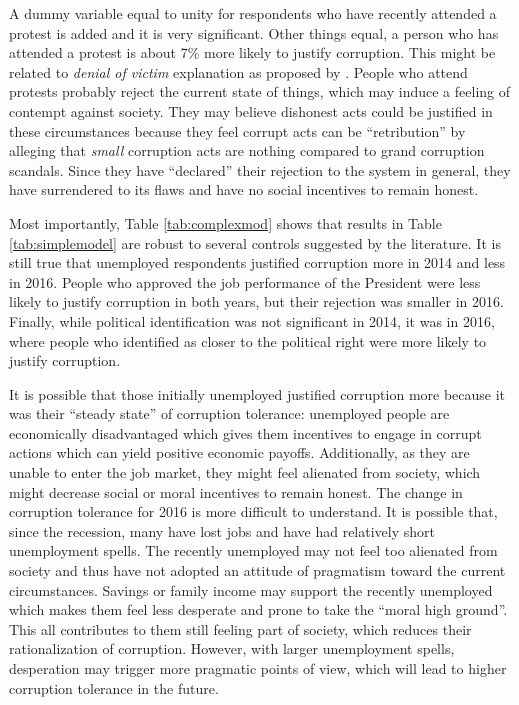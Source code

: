 \documentclass[12pt,a4]{article}\usepackage[]{graphicx}\usepackage[]{xcolor}
\begin{document}


A dummy variable equal to unity for respondents who have recently attended a protest is added and it is very significant. Other things equal, a person who has attended a protest is about 7\% more likely to justify corruption. This might be related to \textit{denial of victim} explanation as proposed by \textcite{Ashforth.2003}. People who attend protests probably reject the current state of things, which may induce a feeling of contempt against society. They may believe dishonest acts could be justified in these circumstances because they feel corrupt acts can be \enquote{retribution} by alleging that \textit{small} corruption acts are nothing compared to grand corruption scandals. Since they have \enquote{declared} their rejection to the system in general, they have surrendered to its flaws and have no social incentives to remain honest.

Most importantly, Table \ref{tab:complexmod} shows that results in Table \ref{tab:simplemodel} are robust to several controls suggested by the literature. It is still true that unemployed respondents justified corruption more in 2014 and less in 2016. People who approved the job performance of the President were less likely to justify corruption in both years, but their rejection was smaller in 2016. Finally, while political identification was not significant in 2014, it was in 2016, where people who identified as closer to the political right were more likely to justify corruption. 

It is possible that those initially unemployed justified corruption more because it was their \enquote{steady state} of corruption tolerance: unemployed people are economically disadvantaged which gives them incentives to engage in corrupt actions which can yield positive economic payoffs. Additionally, as they are unable to enter the job market, they might feel alienated from society, which might decrease social or moral incentives to remain honest. The change in corruption tolerance for 2016 is more difficult to understand. It is possible that, since the recession, many have lost jobs and have had relatively short unemployment spells. The recently unemployed may not feel too alienated from society and thus have not adopted an attitude of pragmatism toward the current circumstances. Savings or family income may support the recently unemployed which makes them feel less desperate and prone to take the \enquote{moral high ground}. This all contributes to them still feeling part of society, which reduces their rationalization of corruption. However, with larger unemployment spells, desperation may trigger more pragmatic points of view, which will lead to higher corruption tolerance in the future.
\end{document}
